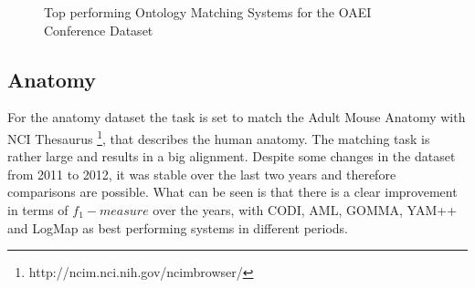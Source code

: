 \documentclass[11pt,titlepage,oneside,openany,a4paper]{report}
\begin{document}
\begin{figure}
 \caption{Top performing Ontology Matching Systems for  the OAEI Conference Dataset}
 \label{img::oaei_conf}
\end{figure}


\subsection{Anatomy}
\label{sec::oaei_anatomy}
For the anatomy dataset the task is set to match the Adult Mouse Anatomy with NCI Thesaurus \footnote{http://ncim.nci.nih.gov/ncimbrowser/}, that describes the human anatomy. The matching task is rather large and results in a big alignment. Despite some changes in the dataset from 2011 to 2012, it was stable over the last two years and therefore comparisons are possible. What can be seen is that there is a clear improvement in terms of $f_1-measure$ over the years, with CODI, AML, GOMMA, YAM++ and LogMap as best performing systems in different periods.
\end{document}
